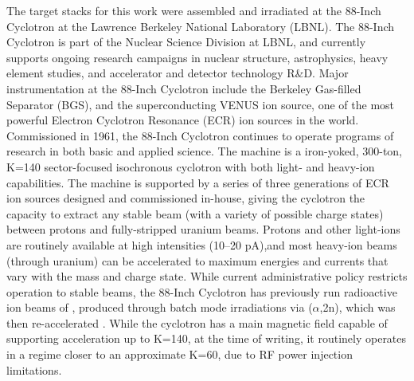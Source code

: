 The target stacks for this work were assembled and irradiated at the 88-Inch Cyclotron at the  Lawrence Berkeley National Laboratory (LBNL).
The 88-Inch Cyclotron is part of the  Nuclear Science Division at LBNL, and  currently supports   ongoing research campaigns in nuclear structure, astrophysics, heavy element studies, and accelerator and detector technology R\&D. 
Major instrumentation at the 88-Inch Cyclotron include the Berkeley Gas-filled Separator (BGS), and the superconducting VENUS ion source, one of the most powerful Electron Cyclotron Resonance (ECR) ion sources in the world.
Commissioned in 1961, the 88-Inch Cyclotron  continues to operate programs of research in both basic and applied science.
The machine is a iron-yoked, 300-ton, K=140 sector-focused isochronous cyclotron with both light- and heavy-ion capabilities. 
The machine is supported by a series of three generations of ECR ion sources designed and commissioned in-house, giving the cyclotron the capacity to extract any stable beam (with a variety of possible charge states) between protons and fully-stripped uranium beams.
Protons and other light-ions are routinely available at high intensities (10--20 p\mmicro A),and most heavy-ion beams (through uranium) can be accelerated to maximum energies and currents that vary with the mass and charge state.
While current administrative policy restricts operation to stable beams, the 88-Inch Cyclotron has previously run radioactive ion beams of , produced through batch mode irradiations via ($\alpha$,2n), which was then re-accelerated \cite{Cooper2004}.
While the cyclotron has a main magnetic field capable of supporting acceleration up to K=140, at the  time of  writing, it routinely operates in a regime closer to an approximate K=60, due to RF power injection limitations.


